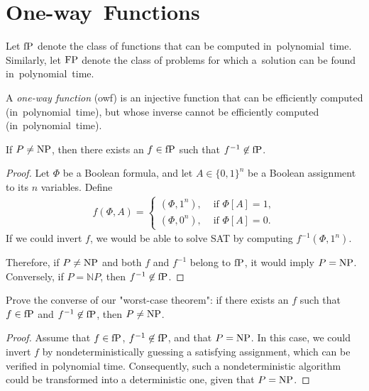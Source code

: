 
\section{One-way~Functions}\label{sec:one_way_functions}

Let $\operatorname{fP}$ denote the class of functions that can be computed in~polynomial~time.
Similarly, let $\operatorname{FP}$ denote the class of problems for which a~solution can be found in~polynomial~time.

\begin{definition}
	A \emph{one-way function} (owf) is an injective function that can be efficiently computed (in~polynomial~time), but whose inverse cannot be efficiently computed (in~polynomial~time).
\end{definition}

\begin{theorem}
If $P \neq \operatorname{NP}$, then there exists an $f \in \operatorname{fP}$ such that $f^{-1} \not\in \operatorname{fP}$.
\end{theorem}

\begin{proof}
    Let $\Phi$ be a Boolean formula, and let $A \in \{0, 1\}^n$ be a Boolean assignment to its $n$ variables.
    Define
    \begin{align*}
        f(\Phi, A) = \begin{cases}
        (\Phi, 1^n), &\text{ if } \Phi[A]=1, \\
        (\Phi, 0^n), &\text{ if } \Phi[A]=0.
        \end{cases}
    \end{align*}
    If we could invert $f$, we would be able to solve SAT by computing $f^{-1}(\Phi, 1^n)$.

    Therefore, if $P \neq \operatorname{NP}$ and both $f$ and $f^{-1}$ belong to $\operatorname{fP}$, it would imply $P = \operatorname{NP}$.
    Conversely, if $P = \mathbb{N}P$, then $f^{-1} \not\in \operatorname{fP}$.
\end{proof}

\begin{exercise}
	Prove the converse of our "worst-case theorem": if there exists an $f$ such that $f \in  \operatorname{fP}$ and $f^{-1} \not\in \operatorname{fP}$, then $P \neq \operatorname{NP}$.
\end{exercise}

\begin{proof}
	Assume that $f \in  \operatorname{fP}$, $f^{-1} \not\in  \operatorname{fP}$, and that $P = \operatorname{NP}$.
	In this case, we could invert $f$ by nondeterministically guessing a satisfying assignment, which can be verified in polynomial time.
	Consequently, such a nondeterministic algorithm could be transformed into a deterministic one, given that $P = \operatorname{NP}$.
\end{proof}

